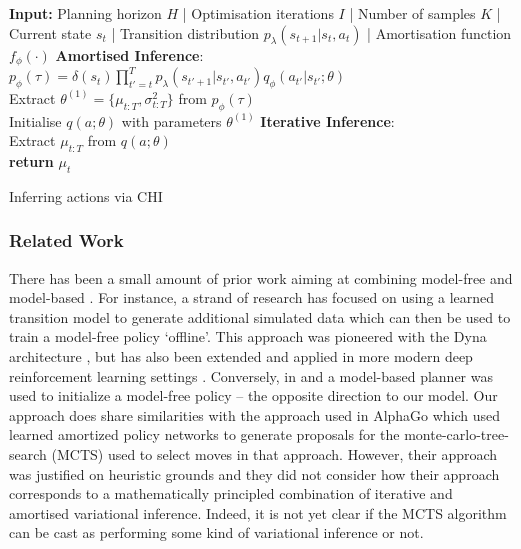 \begin{algorithm}[H]
  \label{algo:chi}
  \SetAlgoLined
     \DontPrintSemicolon
     \textbf{Input:} Planning horizon $H$ | Optimisation iterations $I$ | Number of samples $K$ | Current state $s_t$ |  Transition distribution $p_{\lambda}(s_{t+1}|s_t, a_t)$ | Amortisation function $f_{\phi}(\cdot)$
     \BlankLine
     \textbf{Amortised Inference}: \\
    $p_{\phi}(\tau) = \delta(s_t) \prod_{t'=t}^T p_{\lambda}(s_{t'+1}|s_{t'}, a_{t'}) q_{\phi}(a_{t'}|s_{t'}; \theta)$ \\
     Extract $\theta^{(1)} = \{\mu_{t:T}, \sigma_{t:T}^2 \}$ from $p_{\phi}(\tau) $ \\
     Initialise $q(a; \theta)$ with parameters $\theta^{(1)}$
     \BlankLine
     \textbf{Iterative Inference}: \\
  \BlankLine
  Extract $\mu_{t:T}$ from $q(a; \theta)$ \\
  \textbf{return} $\mu_t$
  \caption{Inferring actions via CHI}
\end{algorithm}


\subsubsection{Related Work}

There has been a small amount of prior work aiming at combining model-free and model-based 
\citep{li2020robot,che2018combining}. For instance, a strand of research has focused on using a learned transition model to generate additional simulated data which can then be used to train a model-free policy `offline'. This approach was pioneered with the Dyna architecture \citep{sutton1991dyna}, but has also been extended and applied in more modern deep reinforcement learning settings \citep{gu2016continuous}. Conversely, in \citep{farshidian2014learning} and \citep{nagabandi2018neural} a model-based planner was used to initialize a model-free policy -- the opposite direction to our model. Our approach does share similarities with the approach used in AlphaGo \citep{silver2017mastering} which used learned amortized policy networks to generate proposals for the monte-carlo-tree-search (MCTS) used to select moves in that approach. However, their approach was justified on heuristic grounds and they did not consider how their approach corresponds to a mathematically principled combination of iterative and amortised variational inference. Indeed, it is not yet clear if the MCTS algorithm can be cast as performing some kind of variational inference or not.


